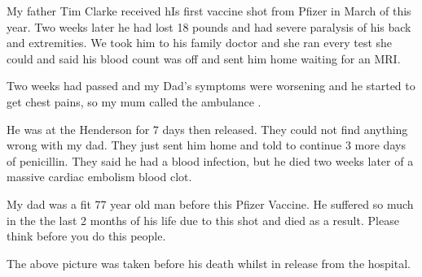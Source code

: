 My father Tim Clarke received hIs first vaccine shot from Pfizer in March of
this year. Two weeks later he had lost 18 pounds and had severe paralysis of his
back and extremities. We took him to his family doctor and she ran every test
she could and said his blood count was off and sent him home waiting for an MRI.

Two weeks had passed and my Dad’s symptoms were worsening and he started to get
chest pains, so my mum called the ambulance .

He was at the Henderson for 7 days then released. They could not find anything
wrong with my dad. They just sent him home and told to continue 3 more days of
penicillin. They said he had a blood infection, but he died two weeks later of a
massive cardiac embolism blood clot.

My dad was a fit 77 year old man before this Pfizer Vaccine. He suffered so much
in the the last 2 months of his life due to this shot and died as a
result. Please think before you do this people.

The above picture was taken before his death whilst in release from the
hospital.

